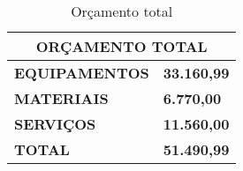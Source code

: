 \begin{table}[H]
\centering
\caption{Orçamento total}
\label{my-label}
\begin{tabular}{|l|l|}
\hline
\multicolumn{2}{|c|}{\textbf{ORÇAMENTO TOTAL}} \\ \hline
\textbf{EQUIPAMENTOS}   & \textbf{33.160,99}   \\ \hline
\textbf{MATERIAIS}      & \textbf{6.770,00}    \\ \hline
\textbf{SERVIÇOS}       & \textbf{11.560,00}   \\ \hline
\textbf{TOTAL}          & \textbf{51.490,99}   \\ \hline
\end{tabular}
\end{table}